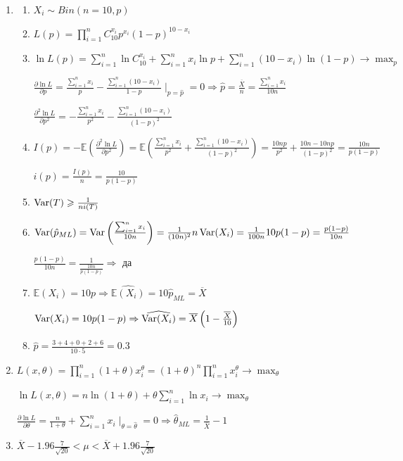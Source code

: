 \documentclass[12pt, a4paper]{article}\usepackage[]{graphicx}\usepackage[]{color}
\begin{document}
\begin{enumerate}
 	\item
	\begin{enumerate}
		\item $X_i \sim Bin (n=10, p)$
		\item $L(p)  = \prod_{i=1}^{n} C_{10}^{x_i} p^{x_i} (1-p)^{10-x_i}$
		\item $\ln L(p) = \sum_{i=1}^{n} \ln C_{10}^{x_i} + \sum_{i=1}^n x_i \ln p + \sum_{i=1}^{n} (10-x_i)\ln (1-p) \to \max_p$
		
		$\frac{\partial \ln L}{\partial p} = \frac{\sum_{i=1}^n x_i}{p} - \frac{\sum_{i=1}^{n} (10-x_i)}{1-p} \mid_{p=\hat{p}} = 0 \Rightarrow \hat{p} = \frac{\overline{X}}{n} = \frac{\sum_{i=1}^{n} x_i}{10n}$
		
		$\frac{\partial^2 \ln L}{\partial p^2} = -\frac{\sum_{i=1}^n x_i}{p^2} -  \frac{\sum_{i=1}^{n} (10-x_i)}{(1-p)^2}$			
		
		\item $I(p) = -\mathbb{E} \left(\frac{\partial^2 \ln L}{\partial p^2}  \right) = \mathbb{E} \left(\frac{\sum_{i=1}^n x_i}{p^2} + \frac{\sum_{i=1}^{n} (10-x_i)}{(1-p)^2}\right) = \frac{10np}{p^2} + \frac{10n - 10np}{(1-p)^2} = \frac{10n}{p(1-p)}$
		
		$i(p) = \frac{I(p)}{n} = \frac{10}{p(1-p)}$
		
		\item $\operatorname{Var}(T) \geqslant \frac{1}{ni(T)}$
		
		\item $\operatorname{Var}(\hat{p}_{ML}) = \operatorname{Var}\left(\frac{\sum_{i=1}^{n} x_i}{10n}\right) = \frac{1}{(10n)^2} n \operatorname{Var}(X_i) = \frac{1}{100n}10p(1-p) = \frac{p(1-p)}{10n}$
		
		$\frac{p(1-p)}{10n} = \frac{1}{\frac{10n}{p(1-p)}} \Rightarrow$ да
		
		\item $\mathbb{E}(X_i) = 10p \Rightarrow \widehat{\mathbb{E}(X_i)} = 10 \hat{p}_{ML} = \overline{X}$
		
		$\operatorname{Var}(X_i) = 10p(1-p) \Rightarrow \widehat{\operatorname{Var}(X_i)} = \overline{X}\left(1-\frac{\overline{X}}{10}\right)$
			
		\item $\hat{p} = \frac{3+4+0+2+6}{10\cdot 5} = 0.3$
	\end{enumerate}
	
	\item $L(x, \theta) = \prod_{i=1}^{n} (1 + \theta) x_i^\theta = (1+\theta)^n \prod_{i=1}^n x_i^\theta \to \max_\theta$
	
	$\ln L (x, \theta) = n\ln (1+\theta) + \theta\sum_{i=1}^{n} \ln x_i \to \max_\theta$
	
	$\frac{\partial \ln L}{\partial \theta} = \frac{n}{1+\theta} + \sum_{i=1}^{n} x_i \mid_{\theta=\hat{\theta}} = 0 \Rightarrow \hat{\theta}_{ML} = \frac{1}{\overline{X}} -1$

	\item $\overline{X} - 1.96 \frac{7}{\sqrt{20}} < \mu <\overline{X} + 1.96 \frac{7}{\sqrt{20}} $
\end{enumerate}
\end{document}
